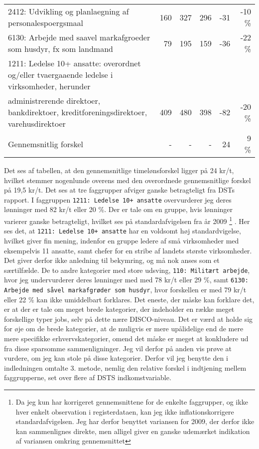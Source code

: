 \begin{table}[H]
{\begin{tabular}{@{}lrrrrr@{}}
2412: Udvikling og planlaegning af personalespoergsmaal	&	160	&	327	&	296	&	-31	&	-10 \%	\\	
6130: Arbejde med saavel markafgroeder som husdyr, fx som landmand	&	79	&	195	&	159	&	-36	&	-22 \%	\\	
1211: Ledelse 10+ ansatte: overordnet og/eller tvaergaaende ledelse i virksomheder,  herunder \\ administrerende direktoer, bankdirektoer, kreditforeningsdirektoer, varehusdirektoer	&	409	&	480	&	398	&	-82	&	-20 \%	\\	\midrule
Gennemsnitlig forskel	&	-	&	-	&	-	&	24	&	9 \%	\\	\bottomrule
\end{tabular} }
\end{table}

Det ses af tabellen, at den gennemsnitlige timelønsforskel ligger på 24 kr/t, hvilket stemmer nogenlunde overens med den overordnede gennemsnitlige forskel på 19,5 kr/t. Det ses at tre faggrupper afviger ganske betragteligt fra DSTs rapport. I faggruppen \texttt{1211: Ledelse 10+ ansatte} overvurderer jeg deres lønninger med 82 kr/t eller 20 \%. Der er tale om en gruppe, hvis lønninger varierer ganske betragteligt, hvilket ses på standardafvigelsen fra år 2009%
%
\footnote{Da jeg kun har korrigeret gennemsnittene for de enkelte faggrupper, og ikke hver enkelt observation i registerdataen, kan jeg ikke inflationskorrigere standardafvigelsen. Jeg har derfor benyttet variansen for 2009, der derfor ikke kan sammenlignes direkte, men alligel giver en ganske udemærket indikation af variansen omkring gennemsnittet}%
%
. Her ses det, at \texttt{1211: Ledelse 10+ ansatte} har en voldsomt høj standardvigelse, hvilket giver fin mening, indenfor en gruppe ledere af små virksomheder med eksempelvis 11 ansatte, samt chefer for en stribe af landets største virksomheder. Det giver derfor ikke anledning til bekymring, og må nok anses som et særtilfælde. 
De to andre kategorier med store udsving, \texttt{110: Militært arbejde}, hvor jeg undervurderer deres lønninger med med 78 kr/t eller 29 \%, samt \texttt{6130: Arbejde med såvel markafgrøder som husdyr}, hvor forskellen er med 79 kr/t eller 22 \% kan ikke umiddelbart forklares. Det eneste, der måske kan forklare det, er at der er tale om meget brede kategorier, der indeholder en række meget forskellige typer jobs, selv på dette nære DISCO-niveau. Det er værd at holde sig for øje om de brede kategorier, at de muligvis er mere upålidelige end de mere mere specifikke erhvervskategorier, omend det måske er meget at konkludere ud fra disse sparsomme sammenligninger. Jeg vil derfor på anden vis prøve at vurdere, om jeg kan stole på disse kategorier. Derfor vil jeg benytte den i indledningen omtalte 3. metode, nemlig den relative forskel i indtjening mellem faggrupperne, set over flere af DSTS indkomstvariable. 

